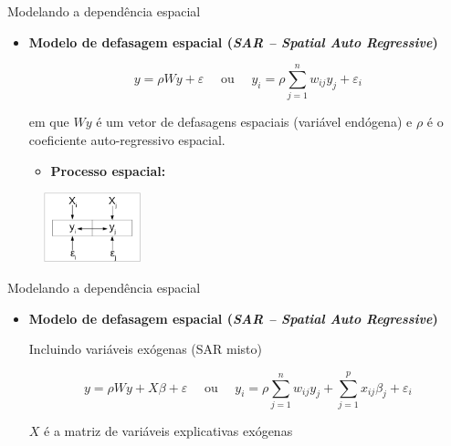 \documentclass[aspectratio=169]{beamer}
\begin{document}
\begin{frame}{Modelando a dependência espacial}
    \begin{itemize}
        \item \textbf{Modelo de defasagem espacial (\textit{SAR -- Spatial Auto Regressive})}
        \vspace{0.5cm}
        \begin{block}{}
            $$y = \rho Wy + \varepsilon \quad \text{ ou }\quad  y_i = \rho \sum_{j=1}^{n} w_{ij} y_j +  \varepsilon_i $$
        \end{block}
        \noindent em que $Wy$ é um vetor de defasagens espaciais (variável endógena)  e $\rho$ é o coeficiente auto-regressivo espacial. 
        \begin{itemize}
            \item \textbf{Processo espacial:}
        \end{itemize}
    \end{itemize}
    \begin{figure}
		\centering
		\includegraphics[width=0.25\textwidth]{img/reg_sar.png}
	\end{figure}
\end{frame}

\begin{frame}{Modelando a dependência espacial}
    \begin{itemize}
        \item \textbf{Modelo de defasagem espacial (\textit{SAR -- Spatial Auto Regressive})}
        
        \vspace{0.5cm}
        Incluindo variáveis exógenas (SAR misto)
        \vspace{0.2cm}
        \begin{block}{}
            $$y = \rho Wy + X\beta + \varepsilon  \quad \text{ ou }\quad  y_i = \rho \sum_{j=1}^{n} w_{ij} y_j + \sum_{j=1}^{p} x_{ij}\beta_j + \varepsilon_i$$
        \end{block}
        \noindent $X$ é a matriz de variáveis explicativas exógenas
    \end{itemize}
\end{frame}
\end{document}
